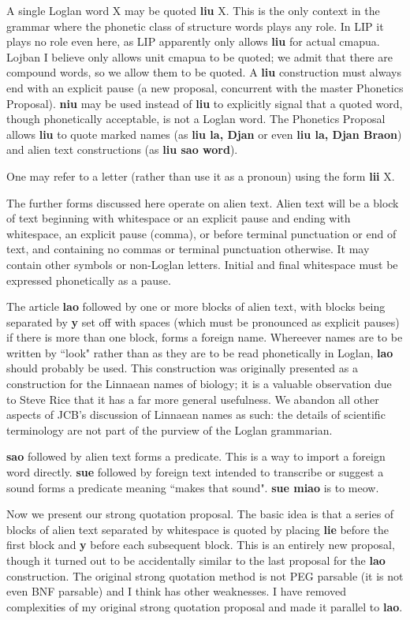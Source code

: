 \documentclass[12pt]{book}
\begin{document}
{A single Loglan word X may be quoted {\bf liu} X.   This is the only context in the grammar where the phonetic class of structure words plays any role.  In LIP it plays no role even here,
as LIP apparently only allows {\bf liu} for actual cmapua.   Lojban I believe only allows unit cmapua to be quoted; we admit that there are compound words,
so we allow them to be quoted.   A {\bf liu} construction must always end with an explicit pause (a new proposal, concurrent with the master Phonetics Proposal).   {\bf niu} may be used instead of {\bf liu}
to explicitly signal that a quoted word, though phonetically acceptable, is not a Loglan word.   The Phonetics Proposal allows {\bf liu} to quote
marked names (as {\bf liu la, Djan} or even {\bf liu la, Djan Braon}) and alien text constructions (as {\bf liu sao word}).

One may refer to a letter (rather than use it as a pronoun) using the form {\bf lii} X.



The further forms discussed here operate on alien text.   Alien text will be a block of text beginning with whitespace or an explicit pause and ending with whitespace, an explicit pause (comma), or before terminal punctuation or end of text,  and containing no commas or terminal punctuation otherwise.
It may contain other symbols or non-Loglan letters.  Initial and final whitespace must be expressed phonetically as a pause.

The article {\bf lao} followed by one or more blocks of alien text, with blocks being separated by {\bf y} set off with spaces (which must be pronounced as explicit pauses) if there is more than one block, forms a foreign name.
Whereever names are to be written by ``look" rather than as they are to be read phonetically in Loglan, {\bf lao} should probably be used.   This construction was originally presented as a construction for the Linnaean names of biology; it is a valuable observation due to Steve Rice that it has a far more general usefulness.  We abandon all other aspects of JCB's discussion of Linnaean names as such:  the details of scientific terminology are not part of the purview of the Loglan grammarian.

{\bf sao} followed by alien text forms a predicate.   This is a way to import a foreign word directly.  {\bf sue} followed by foreign text intended to transcribe or suggest a sound forms a predicate
meaning ``makes that sound".   {\bf sue miao}  is to meow.

Now we present our strong quotation proposal.   The basic idea is that a series of blocks of alien text separated by whitespace is quoted by placing {\bf lie} before the first block
and {\bf y} before each subsequent block. 
This is an entirely new proposal, though it turned out to be accidentally similar to the last proposal for the {\bf lao} construction.  The original strong quotation method is not PEG parsable (it is not even BNF parsable) and I think has other weaknesses.   I have removed complexities of my original strong quotation proposal and made it parallel to {\bf lao}.

}
\end{document}
